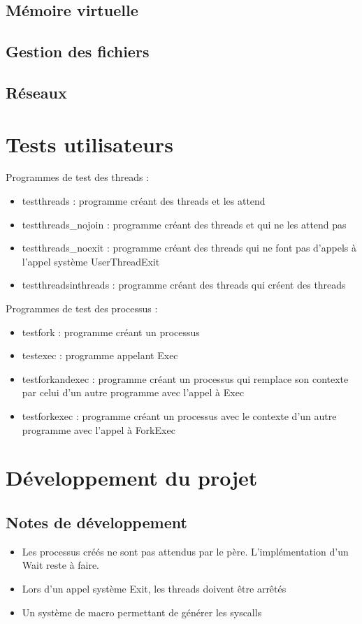 \documentclass{report}
\begin{document}
\section{Mémoire virtuelle}
\section{Gestion des fichiers}
\section{Réseaux}

\chapter{Tests utilisateurs}

Programmes de test des threads :

\begin{itemize}
  \item testthreads : programme créant des threads et les attend
  \item testthreads\_nojoin : programme créant des threads et qui ne les attend pas
  \item testthreads\_noexit : programme créant des threads qui ne font pas d'appels à l'appel
  système UserThreadExit
  \item testthreadsinthreads : programme créant des threads qui créent des threads
  
\end{itemize}

Programmes de test des processus :

\begin{itemize}
  \item testfork : programme créant un processus
  \item testexec : programme appelant Exec
  \item testforkandexec : programme créant un processus qui remplace son contexte par celui d'un autre programme avec l'appel à Exec
  \item testforkexec : programme créant un processus avec le contexte d'un autre programme avec l'appel à ForkExec
\end{itemize}

\chapter{Développement du projet}

\section{Notes de développement}

\begin{itemize}
  \item Les processus créés ne sont pas attendus par le père. L'implémentation d'un Wait reste à faire.
  \item Lors d'un appel système Exit, les threads doivent être arrêtés
  \item Un système de macro permettant de générer les syscalls
\end{itemize}
\end{document}
